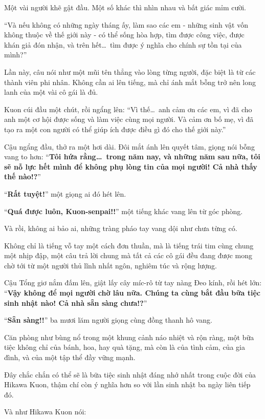 \documentclass[../main.tex]{subfiles}
\begin{document}
Một vài người khẽ gật đầu. Một số khác thì nhìn nhau và bất giác mỉm cười.

``Và nếu không có những ngày tháng ấy, làm sao các em - những sinh vật vốn không thuộc về thế giới này - có thể sống hòa hợp, tìm được công việc, được khán giả đón nhận, và trên hết\dots\ tìm được ý nghĩa cho chính sự tồn tại của mình?''

Lần này, câu nói như một mũi tên thẳng vào lòng từng người, đặc biệt là từ các thành viên phi nhân. Không cần ai lên tiếng, mà chỉ ánh mắt bỗng trở nên long lanh của một vài cô gái là đủ.

Kuon cúi đầu một chút, rồi ngẩng lên: ``Vì thế\dots\ anh cảm ơn các em, vì đã cho anh một cơ hội được sống và làm việc cùng mọi người. Và cảm ơn bố mẹ, vì đã tạo ra một con người có thể giúp ích được điều gì đó cho thế giới này.''

Cậu ngẩng đầu, thở ra một hơi dài.
Đôi mắt ánh lên quyết tâm, giọng nói bỗng vang to hơn: ``\textbf{Tôi hứa rằng\dots\ trong năm nay, và những năm sau nữa, tôi sẽ nỗ lực hết mình để không phụ lòng tin của mọi người!
    Cả nhà thấy thế nào!?}''

``\textbf{Rất tuyệt!}'' một giọng ai đó hét lên.

``\textbf{Quá được luôn, Kuon-senpai!!}'' một tiếng khác vang lên từ góc phòng.

Và rồi, không ai bảo ai, những tràng pháo tay vang dội như chưa từng có.

Không chỉ là tiếng vỗ tay một cách đơn thuần, mà là tiếng trái tim cùng chung một nhịp đập, một câu trả lời chung mà tất cả các cô gái đều đang được mong chờ tới từ một người thủ lĩnh nhất ngôn, nghiêm túc và rộng lượng.

Cậu Tổng giơ nắm đấm lên, giật lấy cây míc-rô từ tay nàng Đeo kính, rồi hét lớn: ``\textbf{Vậy không để mọi người chờ lâu nữa. Chúng ta cùng bắt đầu bữa tiệc sinh nhật nào! Cả nhà sẵn sàng chưa!?}''

``\textbf{Sẵn sàng!!}'' ba mươi lăm người giọng cùng đồng thanh hô vang.

Căn phòng như bùng nổ trong một khung cảnh náo nhiệt và rộn ràng, một bữa tiệc không chỉ của bánh, hoa, hay quà tặng, mà còn là của tình cảm, của gia đình, và của một tập thể đầy vững mạnh.

Đây chắc chắn có thể sẽ là bữa tiệc sinh nhật đáng nhớ nhất trong cuộc đời của Hikawa Kuon, thậm chí còn ý nghĩa hơn so với lần sinh nhật ba ngày liên tiếp đó.

Và như Hikawa Kuon nói:
\end{document}
